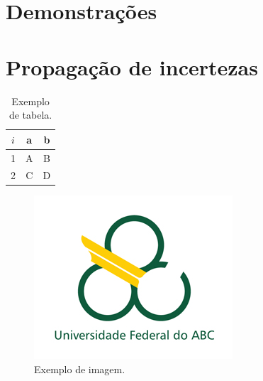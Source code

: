 \documentclass[report,14pt,openright,oneside,a4paper,brazil]{abntex2}
\begin{document}
\chapter{Demonstrações}

\chapter{Propagação de incertezas}

\begin{table}[H]
    \centering
    \begin{tabular}{|c|c|c|}
         \hline
         $i$ & a & b \\
         \hline
         1 & A & B \\
         2 & C & D \\
         \hline
    \end{tabular}
    \caption{Exemplo de tabela.}
    \label{tab:ex}
\end{table}

\begin{figure}[H]
    \centering
    \includegraphics[scale=0.8]{logo.jpg}
    \caption{Exemplo de imagem.}
    \label{fig:ex}
\end{figure}
\end{document}
